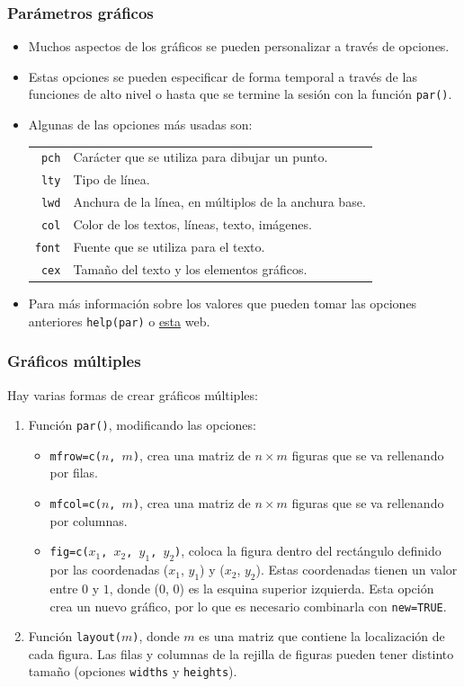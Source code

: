 \documentclass{beamer}
\begin{document}
\begin{frame}
\frametitle{Parámetros gráficos}
\begin{itemize}
\item Muchos aspectos de los gráficos se pueden personalizar a través de opciones.
\item Estas opciones se pueden especificar de forma temporal a través de las funciones de alto nivel o hasta que se termine la sesión con la función \texttt{par()}.
\item Algunas de las opciones más usadas son:
\begin{tabular}{rp{9cm}}
\texttt{pch} & Carácter que se utiliza para dibujar un punto.\\
\texttt{lty} & Tipo de línea.\\
\texttt{lwd} & Anchura de la línea, en múltiplos de la anchura base.\\
\texttt{col} & Color de los textos, líneas, texto, imágenes.\\
\texttt{font} &  Fuente que se utiliza para el texto.\\
\texttt{cex} &  Tamaño del texto y los elementos gráficos.\\
\end{tabular}
\item Para más información sobre los valores que pueden tomar las opciones anteriores \texttt{help(par)} o \href{http://www.statmethods.net/advgraphs/parameters.html}{esta} web.
\end{itemize}
\end{frame}

\begin{frame}
\frametitle{Gráficos múltiples}
Hay varias formas de crear gráficos múltiples:
\begin{enumerate}
\item Función \texttt{par()}, modificando las opciones:
\begin{itemize}
\item \texttt{mfrow=c($n$, $m$)}, crea una matriz de $n \times m$ figuras que se va rellenando por filas.
\item \texttt{mfcol=c($n$, $m$)}, crea una matriz de $n \times m$ figuras que se va rellenando por columnas.
\item \texttt{fig=c($x_1$, $x_2$, $y_1$, $y_2$)}, coloca la figura dentro del rectángulo definido por las coordenadas ($x_1$, $y_1$) y ($x_2$, $y_2$). Estas coordenadas tienen un valor entre $0$ y $1$, donde ($0$, $0$) es la esquina superior izquierda. Esta opción crea un nuevo gráfico, por lo que es necesario combinarla con \texttt{new=TRUE}.
\end{itemize}
\item Función \texttt{layout($m$)}, donde $m$ es una matriz que contiene la localización de cada figura. Las filas y columnas de la rejilla de figuras pueden tener distinto tamaño (opciones \texttt{widths} y \texttt{heights}).
\end{enumerate}
\end{frame}
\end{document}
